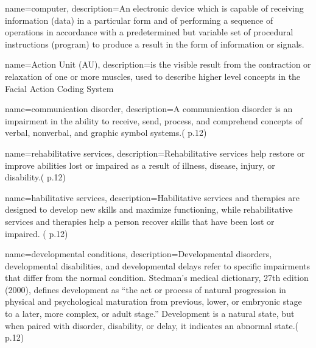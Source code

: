  {
	name={computer}, 
	description={An electronic device which is capable of receiving information (data) in a particular form and of performing a sequence of operations in accordance with a predetermined but variable set of procedural instructions (program) to produce a result in the form of information or signals.
}
}

 {
	name={Action Unit (AU)}, 
	description={is the visible result from the contraction or relaxation of one or more muscles, used to describe higher level concepts in the Facial Action Coding System
}%
}


 {
	name={communication disorder}, 
	description={A communication disorder is an impairment in the ability to receive, send, process, and comprehend concepts of verbal, nonverbal, and graphic symbol systems.(\cite{SLPathologies} p.12)
}
}

 {
	name={rehabilitative services}, 
	description={Rehabilitative services help restore or improve abilities lost or impaired as a result of illness, disease, injury, or disability.(\cite{SLPathologies} p.12)
}
}

 {
	name={habilitative services}, 
	description={Habilitative services and therapies are designed to develop new skills and maximize functioning, while rehabilitative services and therapies help a person recover skills that have been lost or impaired. (\cite{SLPathologies} p.12)
}
}

 {
	name={developmental conditions}, 
	description={Developmental disorders, developmental disabilities, and developmental delays refer to specific impairments that differ from the normal condition. Stedman’s medical dictionary, 27th edition (2000), defines development as “the act or process of natural progression in physical and psychological maturation from previous, lower, or embryonic stage to a later, more complex, or adult stage.” Development is a natural state, but when paired with disorder, disability, or delay, it indicates an abnormal state.(\cite{SLPathologies} p.12)
}
}

